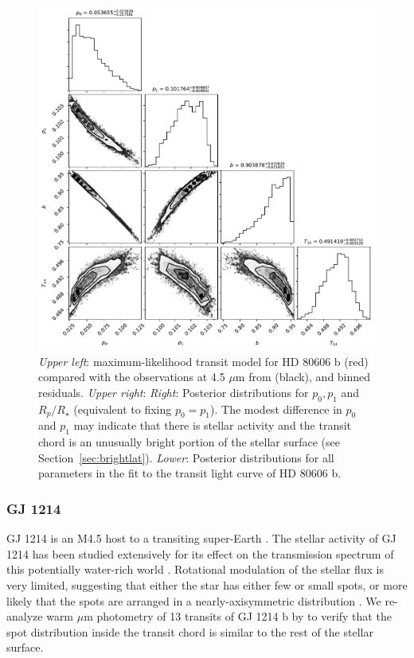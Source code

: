 \begin{figure}
    \includegraphics[scale=0.4]{robin/corner_full_hd80606.pdf}
    \caption{\textsl{Upper left}: maximum-likelihood transit model for HD 80606 b (red) compared with the \spitzer observations at 4.5 $\mu$m from \citet{Hebrard2010} (black), and binned residuals. \textsl{Upper right}: \textsl{Right}: Posterior distributions for $p_0,p_1$ and $R_p/R_\star$ (equivalent to fixing $p_0 = p_1$). The modest difference in $p_0$ and $p_1$ may indicate that there is stellar activity and the transit chord is an unusually bright portion of the stellar surface (see Section~\ref{sec:brightlat}). \textsl{Lower}: Posterior distributions for all parameters in the fit to the transit light curve of HD 80606 b.}
    \label{fig:hd80606}
\end{figure}

\subsubsection{GJ 1214}

GJ 1214 is an M4.5 host to a transiting super-Earth \citep{Charbonneau2009}. The stellar activity of GJ 1214 has been studied extensively for its effect on the transmission spectrum of this potentially water-rich world \citep{Fraine2013}. Rotational modulation of the stellar flux is very limited, suggesting that either the star has either few or small spots, or more likely that the spots are arranged in a nearly-axisymmetric distribution \citep{Berta2011,Narita2013}. We re-analyze warm  $\mu$m photometry of 13 transits of GJ 1214 b by \citet{Gillon2014} to verify that the spot distribution inside the transit chord is similar to the rest of the stellar surface. 

